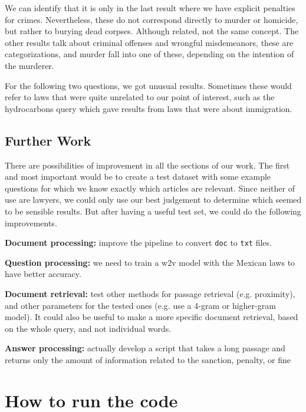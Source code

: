 \documentclass[letterpaper, margin=1in]{article}
\begin{document}
We can identify that it is only in the last result where we have explicit penalties for crimes. Nevertheless, these do not correspond directly to murder or homicide, but rather to burying dead corpses. Although related, not the same concept. The other results talk about criminal offenses and wrongful misdemeanors, these are categorizations, and murder fall into one of these, depending on the intention of the murderer. 

For the following two questions, we got unusual results. Sometimes these would refer to laws that were quite unrelated to our point of interest, such as the hydrocarbons query which gave results from laws that were about immigration. 
 
\subsection{Further Work}
There are possibilities of improvement in all the sections of our work. The first and most important would be to create a test dataset with some example questions for which we know exactly which articles are relevant. Since neither of use are lawyers, we could only use our best judgement to determine which seemed to be sensible results. But after having a useful test set, we could do the following improvements.
\begin{description}
\item \textbf{Document processing:} improve the pipeline to convert \texttt{doc} to \texttt{txt} files.
\item \textbf{Question processing:} we need to train a w2v model with the Mexican laws to have better accuracy.
\item \textbf{Document retrieval:} test other methods for passage retrieval (e.g. proximity), and other parameters for the tested ones (e.g. use a 4-gram or higher-gram model). It could also be useful to make a more specific document retrieval, based on the whole query, and not individual words.
\item \textbf{Answer processing:} actually develop a script that takes a long passage and returns only the amount of information related to the sanction, penalty, or fine
\end{description}

\newpage
\section{How to run the code}
\end{document}
